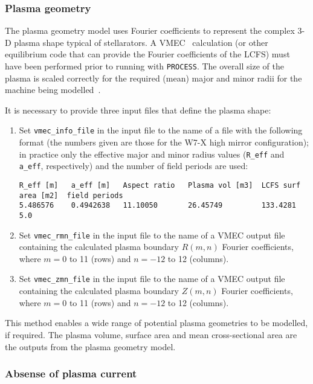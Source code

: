 \documentclass[11pt,a4paper]{report}
\newcommand{\process}{\mbox{\texttt{PROCESS}}}
\begin{document}
\subsubsection{Plasma geometry}

The plasma geometry model uses Fourier coefficients to represent the complex
3-D plasma shape typical of stellarators. A VMEC~\cite{vmec} calculation (or
other equilibrium code that can provide the Fourier coefficients of the LCFS)
must have been performed prior to running with \process. The overall size of
the plasma is scaled correctly for the required (mean) major and minor radii
for the machine being modelled~\cite{geiger}.

It is necessary to provide three input files that define the plasma shape:
\begin{enumerate}

\item Set \texttt{vmec\_info\_file} in the input file to the name of a file
  with the following format (the numbers given are those for the W7-X high
  mirror configuration); in practice only the effective major and minor radius
  values (\texttt{R\_eff} and \texttt{a\_eff}, respectively) and the number of
  field periods are used:

\footnotesize
\begin{verbatim}
R_eff [m]   a_eff [m]   Aspect ratio   Plasma vol [m3]  LCFS surf area [m2]  field periods
5.486576    0.4942638   11.10050       26.45749         133.4281             5.0
\end{verbatim}
\normalsize

\item Set \texttt{vmec\_rmn\_file} in the input file to the name of a VMEC
  output file containing the calculated plasma boundary $R(m,n)$ Fourier
  coefficients, where $m = 0$ to 11 (rows) and $n = -12$ to 12 (columns).

\item Set \texttt{vmec\_zmn\_file} in the input file to the name of a VMEC
  output file containing the calculated plasma boundary $Z(m,n)$ Fourier
  coefficients, where $m = 0$ to 11 (rows) and $n = -12$ to 12 (columns).

\end{enumerate}

This method enables a wide range of potential plasma geometries to be
modelled, if required. The plasma volume, surface area and mean
cross-sectional area are the outputs from the plasma geometry model.

\subsubsection{Absense of plasma current}
\end{document}
